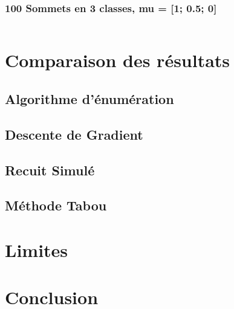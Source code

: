 \documentclass[a4paper]{article}
\begin{document}
		\subsubsection{100 Sommets en 3 classes, mu = [1; 0.5; 0]}
		\begin{verbatim}

		\end{verbatim}

\section{Comparaison des résultats}

	\subsection{Algorithme d'énumération}

	\subsection{Descente de Gradient}

	\subsection{Recuit Simulé}

	\subsection{Méthode Tabou}

\section{Limites}

\section{Conclusion}
\end{document}
